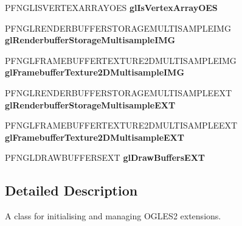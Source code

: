 \begin{DoxyCompactItemize}
\item 
\hypertarget{class_c_p_v_r_tgles2_ext_ae60d3666416d01ff496485b4e4562722}{P\+F\+N\+G\+L\+I\+S\+V\+E\+R\+T\+E\+X\+A\+R\+R\+A\+Y\+O\+E\+S {\bfseries gl\+Is\+Vertex\+Array\+O\+E\+S}}\label{class_c_p_v_r_tgles2_ext_ae60d3666416d01ff496485b4e4562722}

\item 
\hypertarget{class_c_p_v_r_tgles2_ext_a83aedaff0b7b5e92c8dec3d8fc0b7e10}{P\+F\+N\+G\+L\+R\+E\+N\+D\+E\+R\+B\+U\+F\+F\+E\+R\+S\+T\+O\+R\+A\+G\+E\+M\+U\+L\+T\+I\+S\+A\+M\+P\+L\+E\+I\+M\+G {\bfseries gl\+Renderbuffer\+Storage\+Multisample\+I\+M\+G}}\label{class_c_p_v_r_tgles2_ext_a83aedaff0b7b5e92c8dec3d8fc0b7e10}

\item 
\hypertarget{class_c_p_v_r_tgles2_ext_a5f5617e74c2d76e573ee8acf53e4e54f}{P\+F\+N\+G\+L\+F\+R\+A\+M\+E\+B\+U\+F\+F\+E\+R\+T\+E\+X\+T\+U\+R\+E2\+D\+M\+U\+L\+T\+I\+S\+A\+M\+P\+L\+E\+I\+M\+G {\bfseries gl\+Framebuffer\+Texture2\+D\+Multisample\+I\+M\+G}}\label{class_c_p_v_r_tgles2_ext_a5f5617e74c2d76e573ee8acf53e4e54f}

\item 
\hypertarget{class_c_p_v_r_tgles2_ext_af46cb63055f2a06943c45942d9a477f7}{P\+F\+N\+G\+L\+R\+E\+N\+D\+E\+R\+B\+U\+F\+F\+E\+R\+S\+T\+O\+R\+A\+G\+E\+M\+U\+L\+T\+I\+S\+A\+M\+P\+L\+E\+E\+X\+T {\bfseries gl\+Renderbuffer\+Storage\+Multisample\+E\+X\+T}}\label{class_c_p_v_r_tgles2_ext_af46cb63055f2a06943c45942d9a477f7}

\item 
\hypertarget{class_c_p_v_r_tgles2_ext_a301f51e9da8fe91951b12275ceffbafd}{P\+F\+N\+G\+L\+F\+R\+A\+M\+E\+B\+U\+F\+F\+E\+R\+T\+E\+X\+T\+U\+R\+E2\+D\+M\+U\+L\+T\+I\+S\+A\+M\+P\+L\+E\+E\+X\+T {\bfseries gl\+Framebuffer\+Texture2\+D\+Multisample\+E\+X\+T}}\label{class_c_p_v_r_tgles2_ext_a301f51e9da8fe91951b12275ceffbafd}

\item 
\hypertarget{class_c_p_v_r_tgles2_ext_abedc4e1076a2ebb01ef02cb8a3abb380}{P\+F\+N\+G\+L\+D\+R\+A\+W\+B\+U\+F\+F\+E\+R\+S\+E\+X\+T {\bfseries gl\+Draw\+Buffers\+E\+X\+T}}\label{class_c_p_v_r_tgles2_ext_abedc4e1076a2ebb01ef02cb8a3abb380}

\end{DoxyCompactItemize}


\subsection{Detailed Description}
A class for initialising and managing O\+G\+L\+E\+S2 extensions. 



